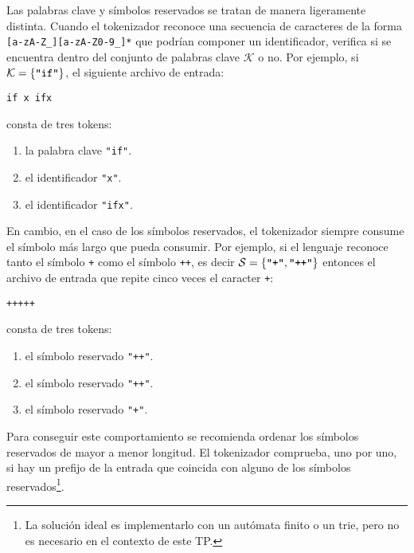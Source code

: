 \documentclass{article}
\begin{document}
\begin{itemize}
      Las palabras clave y s\'imbolos reservados se tratan de manera ligeramente distinta.
      Cuando el tokenizador reconoce una secuencia de caracteres de la forma \verb|[a-zA-Z_][a-zA-Z0-9_]*|
      que podr\'ian componer un identificador, verifica si se encuentra dentro del conjunto
      de palabras clave $\mathcal{K}$ o no. Por ejemplo, si $\mathcal{K} = \{\verb|"if"|\}$,
      el siguiente archivo de entrada:
      \begin{center}
        \verb|if x ifx|
      \end{center}
      consta de tres tokens:
      \begin{enumerate}
      \item la palabra clave \verb|"if"|.
      \item el identificador \verb|"x"|.
      \item el identificador \verb|"ifx"|.
      \end{enumerate}
      En cambio, en el caso de los s\'imbolos reservados, el tokenizador siempre consume el s\'imbolo m\'as largo que pueda consumir. Por ejemplo, si el lenguaje reconoce
      tanto el s\'imbolo \verb|+| como el s\'imbolo \verb|++|,
      es decir $\mathcal{S} = \{\verb|"+"|, \verb|"++"|\}$
      entonces el archivo de entrada que repite cinco veces el caracter \verb|+|:
      \begin{center}
        \verb|+++++|
      \end{center}
      consta de tres tokens:
      \begin{enumerate}
      \item el s\'imbolo reservado \verb|"++"|.
      \item el s\'imbolo reservado \verb|"++"|.
      \item el s\'imbolo reservado \verb|"+"|.
      \end{enumerate}
      Para conseguir este comportamiento se recomienda ordenar los
      s\'imbolos reservados de mayor a menor longitud.
      El tokenizador comprueba, uno por uno, si hay un prefijo
      de la entrada que coincida con alguno de los s\'imbolos
      reservados\footnote{La soluci\'on ideal es implementarlo con un
      aut\'omata finito o un trie,
      pero no es necesario en el contexto de este TP.}.
     

\end{itemize}
\end{document}
